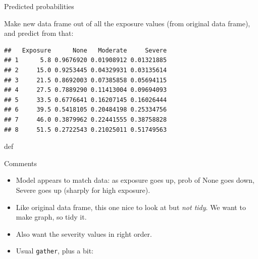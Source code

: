 \documentclass[ignorenonframetext,]{beamer}
\newenvironment{Shaded}{\begin{snugshade}}{\end{snugshade}}
\newcommand{\DataTypeTok}[1]{\textcolor[rgb]{0.13,0.29,0.53}{#1}}
\newcommand{\FloatTok}[1]{\textcolor[rgb]{0.00,0.00,0.81}{#1}}
\newcommand{\KeywordTok}[1]{\textcolor[rgb]{0.13,0.29,0.53}{\textbf{#1}}}
\newcommand{\NormalTok}[1]{#1}
\newcommand{\OperatorTok}[1]{\textcolor[rgb]{0.81,0.36,0.00}{\textbf{#1}}}
\newcommand{\StringTok}[1]{\textcolor[rgb]{0.31,0.60,0.02}{#1}}
\begin{document}
\begin{frame}[fragile]{Predicted probabilities}
\protect\hypertarget{predicted-probabilities}{}

Make new data frame out of all the exposure values (from original data
frame), and predict from that:

\begin{Shaded}
\end{Shaded}

\begin{verbatim}
##   Exposure      None   Moderate     Severe
## 1      5.8 0.9676920 0.01908912 0.01321885
## 2     15.0 0.9253445 0.04329931 0.03135614
## 3     21.5 0.8692003 0.07385858 0.05694115
## 4     27.5 0.7889290 0.11413004 0.09694093
## 5     33.5 0.6776641 0.16207145 0.16026444
## 6     39.5 0.5418105 0.20484198 0.25334756
## 7     46.0 0.3879962 0.22441555 0.38758828
## 8     51.5 0.2722543 0.21025011 0.51749563
\end{verbatim}

def

\end{frame}

\begin{frame}[fragile]{Comments}
\protect\hypertarget{comments-12}{}

\begin{itemize}
\item
  Model appears to match data: as exposure goes up, prob of None goes
  down, Severe goes up (sharply for high exposure).
\item
  Like original data frame, this one nice to look at but \emph{not
  tidy}. We want to make graph, so tidy it.
\item
  Also want the severity values in right order.
\item
  Usual \texttt{gather}, plus a bit:
\end{itemize}

\begin{Shaded}
\end{Shaded}

\end{frame}
\end{document}
